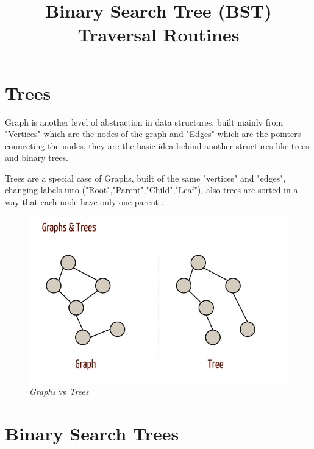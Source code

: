 \documentclass[10pt,a4paper]{article}
\title{Binary Search Tree (BST) Traversal Routines}
\begin{document}
\maketitle

\section{Trees}

Graph is another level of abstraction in data structures, built mainly from "Vertices" which are the nodes of the graph and "Edges" which are the pointers connecting the nodes, they are the basic idea behind another structures like trees and binary trees.

Trees are a special case of Graphs, built of the same "vertices" and "edges", changing labels into ("Root","Parent","Child","Leaf"), also trees are sorted in a way that each node have only one parent \cite{bt}\cite{bst}\cite{graph}.

\begin{figure}[htbp]
\centering
\includegraphics[width=\textwidth]{images/gtree.png}
\caption{\emph{Graphs} vs \emph{Trees}}
\end{figure}


\section{Binary Search Trees}
\end{document}
